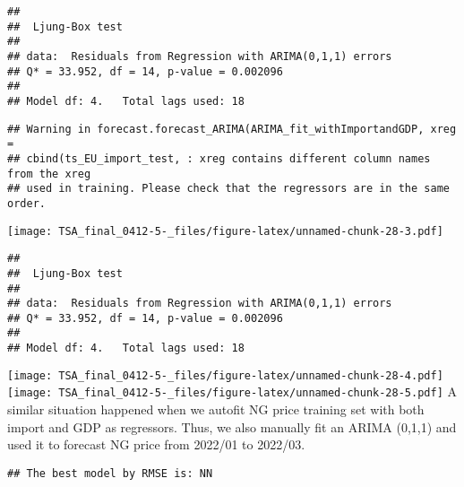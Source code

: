 \documentclass[
]{article}
\begin{document}
\begin{verbatim}
## 
##  Ljung-Box test
## 
## data:  Residuals from Regression with ARIMA(0,1,1) errors
## Q* = 33.952, df = 14, p-value = 0.002096
## 
## Model df: 4.   Total lags used: 18
\end{verbatim}

\begin{verbatim}
## Warning in forecast.forecast_ARIMA(ARIMA_fit_withImportandGDP, xreg =
## cbind(ts_EU_import_test, : xreg contains different column names from the xreg
## used in training. Please check that the regressors are in the same order.
\end{verbatim}

\texttt{[image: TSA\_final\_0412-5-\_files/figure-latex/unnamed-chunk-28-3.pdf]}

\begin{verbatim}
## 
##  Ljung-Box test
## 
## data:  Residuals from Regression with ARIMA(0,1,1) errors
## Q* = 33.952, df = 14, p-value = 0.002096
## 
## Model df: 4.   Total lags used: 18
\end{verbatim}

\texttt{[image: TSA\_final\_0412-5-\_files/figure-latex/unnamed-chunk-28-4.pdf]}
\texttt{[image: TSA\_final\_0412-5-\_files/figure-latex/unnamed-chunk-28-5.pdf]}
A similar situation happened when we autofit NG price training set with
both import and GDP as regressors. Thus, we also manually fit an ARIMA
(0,1,1) and used it to forecast NG price from 2022/01 to 2022/03.

\begin{verbatim}
## The best model by RMSE is: NN
\end{verbatim}
\end{document}
